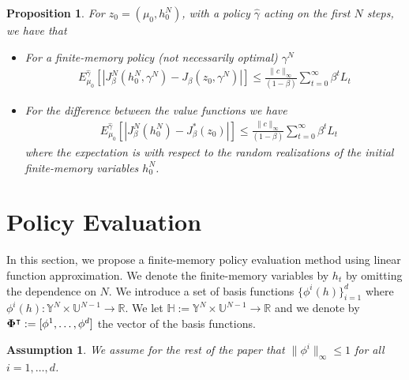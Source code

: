 \documentclass[letterpaper, 10 pt, conference]{ieeeconf}  %
\newtheorem{prop}{Proposition}
\newtheorem{assumption}{Assumption}
\theoremstyle{definition}
\theoremstyle{remark}
\begin{document}
\begin{prop}\cite[Theorem 3.3]{kara2023convergence}\label{cont_bound}
For ${z}_0=(\mu_0,h_0^N)$, with a policy $\hat{\gamma}$ acting on the first $N$ steps, we have that
\begin{itemize}
\item For a finite-memory policy (not necessarily optimal) $\gamma^N$
\begin{align*}
E_{\mu_0}^{\hat{\gamma}}\left[\left|J^N_\beta(h_0^N,\gamma^N) -J_\beta({z}_0,\gamma^N)\right|\right]\leq  \frac{\|c\|_\infty }{(1-\beta)}\sum_{t=0}^\infty\beta^tL_t
\end{align*}
\item For the difference between the value functions we have%
\begin{align*}
&E_{\mu_0}^{\hat{\gamma}}\left[\left|J^N_\beta(h_0^N) -J^*_\beta({z}_0)\right|\right]\leq  \frac{\|c\|_\infty }{(1-\beta)}\sum_{t=0}^\infty\beta^tL_t
\end{align*}
where the expectation is with respect to the random realizations of the initial finite-memory variables $h_0^N$.
\end{itemize}
\end{prop}



\section{Policy Evaluation} In this section, we propose a finite-memory policy evaluation method using linear function approximation. We denote the finite-memory variables by $h_t$ 
by omitting the dependence on $N$. We introduce a set of basis functions $\{\phi^i(h)\}_{i=1}^d$ where  $\phi^i(h):\mathds{Y}^N\times\mathds{U}^{N-1}\to \mathds{R}$. We let $\mathds{H}:=\mathds{Y}^N\times\mathds{U}^{N-1}\to \mathds{R}$ and  we denote by ${\bf \Phi}^\intercal:= [\phi^1,\dots,\phi^d]$ the vector of the basis functions.
\begin{assumption}
We assume for the rest of the paper that $
\|\phi^i\|_\infty\leq 1$
for all $i=1,\dots,d$.
\end{assumption}
\end{document}

